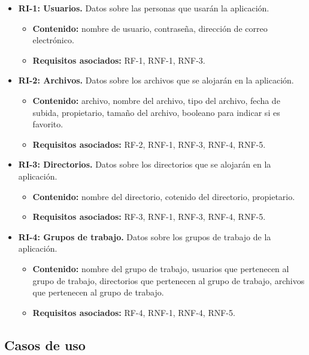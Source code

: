 \begin{itemize}
	\item \textbf{RI-1: Usuarios.} Datos sobre las personas que usarán la aplicación.
	\begin{itemize}
			\item \textbf{Contenido:} nombre de usuario, contraseña, dirección de correo electrónico.
			\item \textbf{Requisitos asociados:} RF-1, RNF-1, RNF-3.
	\end{itemize}
	
	\item \textbf{RI-2: Archivos.} Datos sobre los archivos que se alojarán en la aplicación.
	\begin{itemize}
		\item \textbf{Contenido:} archivo, nombre del archivo, tipo del archivo, fecha de subida, propietario, tamaño del archivo, booleano para indicar si es favorito.
		\item \textbf{Requisitos asociados:} RF-2, RNF-1, RNF-3, RNF-4, RNF-5.
	\end{itemize}
	
	\item \textbf{RI-3: Directorios.} Datos sobre los directorios que se alojarán en la aplicación.
	\begin{itemize}
		\item \textbf{Contenido:} nombre del directorio, cotenido del directorio, propietario.
		\item \textbf{Requisitos asociados:} RF-3, RNF-1, RNF-3, RNF-4, RNF-5.
	\end{itemize}
	
	\item \textbf{RI-4: Grupos de trabajo.} Datos sobre los grupos de trabajo de la aplicación.
	\begin{itemize}
		\item \textbf{Contenido:} nombre del grupo de trabajo, usuarios que pertenecen al grupo de trabajo, directorios que pertenecen al grupo de trabajo, archivos que pertenecen al grupo de trabajo.
		\item \textbf{Requisitos asociados:} RF-4, RNF-1, RNF-4, RNF-5.
	\end{itemize}
\end{itemize}

\subsection{Casos de uso}
